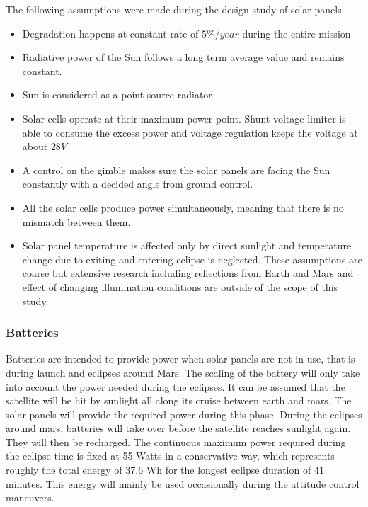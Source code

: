 \documentclass[a4paper, oneside, 11pt]{article}
\begin{document}
\noindent The following assumptions were made during the design study of solar panels.
\begin{itemize}
\item Degradation happens at constant rate of $5\%/year$ during the entire mission \cite{Solar_panel_degradation}
\item Radiative power of the Sun follows a long term average value and remains constant.
\item Sun is considered as a point source radiator
\item Solar cells operate at their maximum power point. Shunt voltage limiter is able to consume the excess power and voltage regulation keeps the voltage at about $28V$
\item A control on the gimble makes sure the solar panels are facing the Sun constantly with a decided angle from ground control.
\item All the solar cells produce power simultaneously, meaning that there is no mismatch between them.
\item Solar panel temperature is affected only by direct sunlight and temperature change due to exiting and entering eclipse is neglected. These assumptions are coarse but extensive research including reflections from Earth and Mars and effect of changing illumination conditions are outside of the scope of this study.
\end{itemize}

\subsubsection{Batteries}

Batteries are intended to provide power when solar panels are not in use, that is during launch and eclipses around Mars. The scaling of the battery will only take into account the power needed during the eclipses. It can be assumed that the satellite will be hit by sunlight all along its cruise between earth and mars. The solar panels will provide the required power during this phase. During the eclipses around mars, batteries will take over before the satellite reaches sunlight again. They will then be recharged. 
The continuous maximum power required during the eclipse time is fixed at 55 Watts in a conservative way, which represents roughly the total energy of 37.6 Wh for the longest eclipse duration of 41 minutes. This energy will mainly be used occasionally during the attitude control maneuvers.
\end{document}

